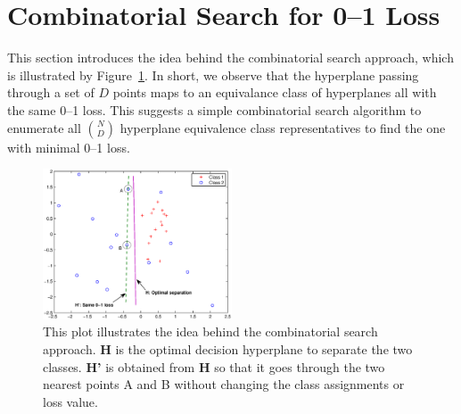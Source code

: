 \section{Combinatorial Search for 0--1 Loss}
\label{cha:combinatorialsearch}

This section introduces the idea behind the combinatorial search
approach, which is illustrated by Figure~\ref{fig:cs_intro}. In short,
we observe that the hyperplane passing through a set of $D$ points
maps to an equivalance class of hyperplanes all with the same 0--1
loss.  This suggests a simple combinatorial search algorithm to
enumerate all $\binom{N}{D}$ hyperplane equivalence class representatives 
to find the one with minimal 0--1 loss.

\begin{figure}[here]
\includegraphics[width=0.50\textwidth]{images/fig41_intro.eps}
\caption{ \footnotesize This plot illustrates the idea behind
  the combinatorial search approach. {\bf H} is the
  optimal decision hyperplane to separate the two classes. {\bf H'} is
  obtained from {\bf H} 
  so that it goes through the two nearest points A and B
  without changing the class assignments or loss value.}
\label{fig:cs_intro}
\end{figure}

